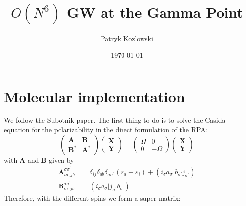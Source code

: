 \documentclass[12pt]{article}
\title{$O(N^6)$ GW at the Gamma Point}
\author{Patryk Kozlowski}
\date{\today}
\begin{document}
\maketitle
\section{Molecular implementation}
We follow the Subotnik paper. The first thing to do is to solve the Casida equation for the polarizability in the direct formulation of the RPA:
\begin{equation}\label{eq:kptsCasida}
	\begin{pmatrix}
        \mathbf{A}  & \mathbf{B} \\
        \mathbf{B}^{*} & \mathbf{A}^{*}
    \end{pmatrix}
    \begin{pmatrix}
        \mathbf{X} \\
        \mathbf{Y}
    \end{pmatrix}
    =
    \begin{pmatrix}
        \Omega & 0 \\
        0 & -\Omega
    \end{pmatrix}
    \begin{pmatrix}
        \mathbf{X} \\
        \mathbf{Y}
    \end{pmatrix}
\end{equation}
with $\mathbf{A}$ and $\mathbf{B}$ given by
    \begin{align}\nonumber
    \mathbf{A}_{ia, jb}^{\sigma \sigma ^{\prime}} &= \delta_{ij}\delta_{ab}\delta_{\sigma \sigma ^{\prime}}(\varepsilon_a - \varepsilon_i) + (i_{\sigma}a_{\sigma}|b_{\sigma ^{\prime}}j_{\sigma ^{\prime}}) \\
    \mathbf{B}_{ia, jb}^{\sigma \sigma ^{\prime}} &= (i_{\sigma}a_{\sigma}|j_{\sigma ^{\prime}}b_{\sigma ^{\prime}})
\end{align}
Therefore, with the different spins we form a super matrix:
\end{document}
